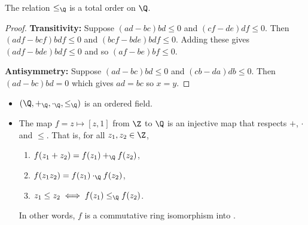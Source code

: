 \begin{proposition*}
    The relation $\le_\Q$ is a total order on $\Q$.
\end{proposition*}
\begin{proof}
    \textbf{Transitivity:} Suppose $(ad - bc) bd \le 0$ and $(cf - de) df \le
    0$.
    Then $(adf - bcf) bdf \le 0$ and $(bcf - bde) bdf \le 0$.
    Adding these gives $(adf - bde) bdf \le 0$ and so $(af - be) bf \le 0$.

    \textbf{Antisymmetry:} Suppose $(ad - bc) bd \le 0$ and $(cb - da) db \le 0$.
    Then $(ad - bc) bd = 0$ which gives $ad = bc$ so $x = y$.
\end{proof}
\begin{theorem*} \leavevmode
    \begin{itemize}
        \item $(\Q, +_\Q, \cdot_\Q, \le_\Q)$ is an ordered field.
        \item The map $f = z \mapsto [z, 1]$ from $\Z$ to $\Q$ is an
        injective map that respects $+$, $\cdot$ and $\le$.
        That is, for all $z_1, z_2 \in \Z$,
        \begin{enumerate}
            \item $f(z_1 + z_2) = f(z_1) +_\Q f(z_2)$,
            \item $f(z_1 z_2) = f(z_1) \cdot_\Q f(z_2)$,
            \item $z_1 \le z_2 \iff f(z_1) \le_\Q f(z_2)$.
        \end{enumerate}
        In other words, $f$ is a commutative ring isomorphism into \Q.
    \end{itemize}
\end{theorem*}
